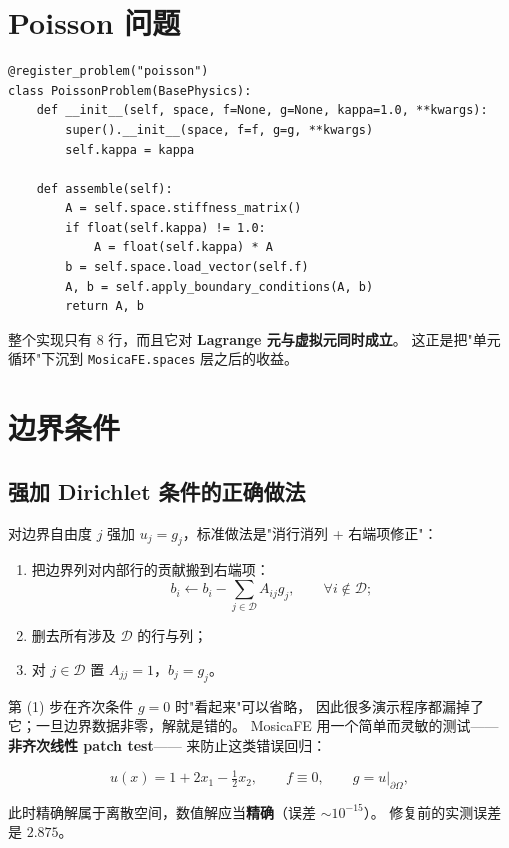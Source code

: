 \documentclass[UTF8,11pt,oneside]{ctexbook}
\theoremstyle{definition}
\theoremstyle{plain}
\newenvironment{important}{%
  \begin{tcolorbox}[colback=blue!5,colframe=blue!45,title=要点,fonttitle=\bfseries]%
}{%
  \end{tcolorbox}%
}
\newenvironment{caution}{%
  \begin{tcolorbox}[colback=orange!5,colframe=orange!55,title=注意,fonttitle=\bfseries]%
}{%
  \end{tcolorbox}%
}
\newcommand{\mosica}{\textsf{MosicaFE}}
\newcommand{\module}[1]{\texttt{MosicaFE.#1}}
\begin{document}
\section{Poisson 问题}

\begin{lstlisting}[language=MosicaFE,caption={示例 6.2：Poisson 问题的组装（完整实现）}]
@register_problem("poisson")
class PoissonProblem(BasePhysics):
    def __init__(self, space, f=None, g=None, kappa=1.0, **kwargs):
        super().__init__(space, f=f, g=g, **kwargs)
        self.kappa = kappa

    def assemble(self):
        A = self.space.stiffness_matrix()
        if float(self.kappa) != 1.0:
            A = float(self.kappa) * A
        b = self.space.load_vector(self.f)
        A, b = self.apply_boundary_conditions(A, b)
        return A, b
\end{lstlisting}

\begin{important}
整个实现只有 8 行，而且它对 \textbf{Lagrange 元与虚拟元同时成立}。
这正是把"单元循环"下沉到 \module{spaces} 层之后的收益。
\end{important}

\section{边界条件}

\subsection{强加 Dirichlet 条件的正确做法}

对边界自由度 $j$ 强加 $u_j=g_j$，标准做法是"消行消列 + 右端项修正"：

\begin{enumerate}[label=(\arabic*),itemsep=0.15em]
  \item 把边界列对内部行的贡献搬到右端项：
        \begin{equation}
        b_i \leftarrow b_i-\sum_{j\in\mathcal{D}}A_{ij}g_j,
        \qquad \forall i\notin\mathcal{D};
        \label{eq:bc-lift}
        \end{equation}
  \item 删去所有涉及 $\mathcal{D}$ 的行与列；
  \item 对 $j\in\mathcal{D}$ 置 $A_{jj}=1$，$b_j=g_j$。
\end{enumerate}

\begin{caution}
第 (1) 步在齐次条件 $g=0$ 时"看起来"可以省略，
因此很多演示程序都漏掉了它；一旦边界数据非零，解就是错的。
\mosica{} 用一个简单而灵敏的测试——\textbf{非齐次线性 patch test}——
来防止这类错误回归：

\begin{equation}
u(x)=1+2x_1-\tfrac12 x_2,\qquad f\equiv0,\qquad g=u|_{\partial\Omega},
\label{eq:patch}
\end{equation}

此时精确解属于离散空间，数值解应当\textbf{精确}（误差 $\sim10^{-15}$）。
修复前的实测误差是 $2.875$。
\end{caution}
\end{document}
